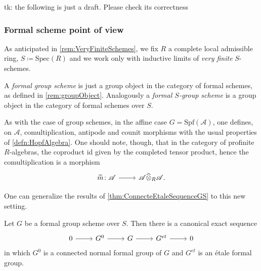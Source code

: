 \documentclass[../Main]{subfiles}
\begin{document}
tk: the following is just a draft. Please check its correctness

\subsubsection{Formal scheme point of view}
As anticipated in \cref{rem:VeryFiniteSchemes},
we fix $R$ a complete local admissible ring, $S \coloneqq \mathrm{Spec}(R)$
and we work only with inductive limits of {\em very finite} $S$-schemes.
\begin{defn}
	A {\em formal group scheme}
	is just a group object in the category of formal schemes,
	 as defined in \cref{rem:groupObject}.
	Analogously a {\em formal $S$-group scheme}
	is a group object in the category of formal schemes over $S$.
\end{defn}


\begin{rem}[]\label{rem:FormalHopf}
	As with the case of group schemes, in the affine case
	$G = \mathrm{Spf}(\mathscr{A})$,
	one defines, on $\mathscr{A}$, comultiplication, antipode and counit morphisms
	with the usual properties of \cref{defn:HopfAlgebra}.
	One should note, though, that in the category of 
	profinite $R$-algebras, the coproduct id given by
	the completed tensor product, hence the comultiplication
	is a morphism
	\begin{equation*}
	\begin{tikzcd}[row sep = 0ex
		,/tikz/column 1/.append style={anchor=base east}
		,/tikz/column 2/.append style={anchor=base west}]
		\widetilde{m}\colon \mathscr{A} \arrow[r, "", rightarrow] &
		\mathscr{A} \widehat{\otimes}_R \mathscr{A}
	.\end{tikzcd}
	\end{equation*} 
\end{rem}


One can generalize the results of \cref{thm:ConnecteEtaleSequenceGS} to this new setting.
\begin{thm}
	Let $G$ be a formal group scheme over $S$.
	Then there is a canonical exact sequence
	\begin{equation*}
	\begin{tikzcd}
		0 \arrow[r, "", rightarrow] &
		G^0 \arrow[r, "", rightarrow] &
		G \arrow[r, "", rightarrow] &
		G^{et} \arrow[r, "", rightarrow] &
		0
	\end{tikzcd}
	\end{equation*}
	in which $G^0$ is a connected normal formal group of $G$
	and $G^{et}$ is an étale formal group.
\end{thm}
\end{document}

